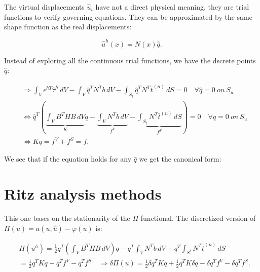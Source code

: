 	The virtual displacements $\hat{u}_i$ have not a direct physical meaning, they are trial functions to verify governing equations. They can be approximated by the same shape function as the real displacements:
	
	\begin{equation}
	\hat{u}^h (x) = N(x) \hat{q}. 
	\end{equation}
	
	Instead of exploring all the continuous trial functions, we have the dscrete points $\hat{q}$:
	
	\begin{equation}
	\begin{aligned}
	&\Rightarrow \int _V \epsilon ^{hT} \hat{\tau} ^h \, dV - \int _V \hat{q}^TN^Tb \, dV - \int _{S_t} \hat{q}^TN^T \bar{t}^{(n)} \, dS = 0 \quad \forall \hat{q} = 0 \ on \ S_u\\
	&\Leftrightarrow \hat{q}^T \left( \underbrace{\int _V B^T HB \, dV}_K q - \underbrace{\int _V N^Tb \, dV}_{f^V} - \underbrace{\int _{S_t} N^T \bar{t}^{(n)} \, dS}_{f^S}\right) = 0 \quad \forall \hat{q} = 0 \ on \ S_u\\
	&\Leftrightarrow Kq = f^V + f^S = f.
	\end{aligned}
	\end{equation}
	
	We see that if the equation holds for any $\hat{q}$ we get the canonical form:
	
	\begin{center}
	\end{center}
	
\section{Ritz analysis methods}
	This one bases on the stationarity of the $\Pi$ functional. The discretized version of $\Pi (u) = a(u,\hat{u}) - \varphi (u)$ is:
	
	\begin{equation}
	\begin{aligned}
	&\Pi (u^h) = \frac{1}{2} q^T \left( \int _V B^T HB \, dV \right) q - q^T \int _V N^T b \, dV - q^T \int _{S^t} N^T \bar{t}^{(n)} \, dS \\
	&= \frac{1}{2} q^T Kq - q^T f^V - q^Tf^S \quad \Rightarrow \delta \Pi (u) = \frac{1}{2} \delta q^T K q + \frac{1}{2} q^T K \delta q - \delta q^T f^V - \delta q^Tf^S.
	\end{aligned}
	\end{equation}
	
